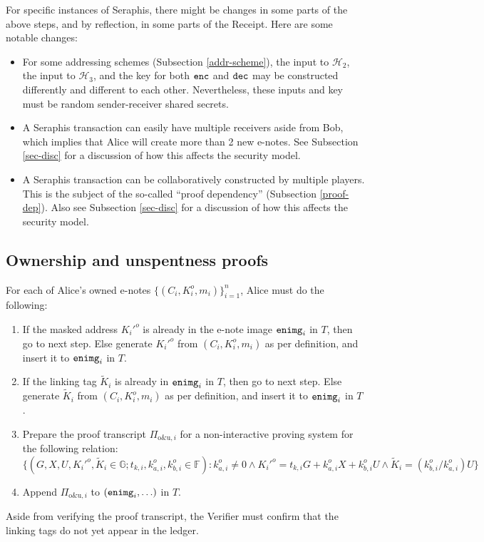\documentclass{article}
\begin{document}
For specific instances of Seraphis, there might be changes in some parts of the above steps, and by reflection, in some parts of the Receipt. Here are some notable changes:
\begin{itemize}
\item For some addressing schemes (Subsection \ref{addr-scheme}), the input to $\mathcal{H}_2$, the input to $\mathcal{H}_3$, and the key for both ${\tt enc}$ and ${\tt dec}$ may be constructed differently and different to each other. Nevertheless, these inputs and key must be random sender-receiver shared secrets.
\item A Seraphis transaction can easily have multiple receivers aside from Bob, which implies that Alice will create more than 2 new e-notes. See Subsection \ref{sec-disc} for a discussion of how this affects the security model.
\item A Seraphis transaction can be collaboratively constructed by multiple players. This is the subject of the so-called ``proof dependency'' (Subsection \ref{proof-dep}). Also see Subsection \ref{sec-disc} for a discussion of how this affects the security model.
\end{itemize}

\subsection{Ownership and unspentness proofs}\label{own-unsp}
For each of Alice's owned e-notes $\{(C_i,K_i^o,m_i)\}_{i=1}^n$, Alice must do the following:
\begin{enumerate}
    \item If the masked address $K_i'^o$ is already in the e-note image ${\tt enimg}_i$ in $T$, then go to next step. Else generate $K_i'^o$ from $(C_i, K_i^o, m_i)$ as per definition, and insert it to ${\tt enimg}_i$ in $T$.
    \item If the linking tag $\tilde{K}_i$ is already in ${\tt enimg}_i$ in $T$, then go to next step. Else generate $\tilde{K}_i$ from $(C_i, K_i^o, m_i)$ as per definition, and insert it to ${\tt enimg}_i$ in $T$.
    \item Prepare the proof transcript $\Pi_{\text{o\&u}, i}$ for a non-interactive proving system for the following relation:
$$\{(G, X, U, K_i'^o, \tilde{K}_i\in\mathbb{G}; t_{k,i}, k_{a,i}^o, k_{b,i}^o\in\mathbb{F}): k_{a,i}^o \ne 0 \wedge K_i'^o = t_{k,i} G + k_{a,i}^o X + k_{b,i}^o U \wedge \tilde{K}_i = (k_{b,i}^o/k_{a,i}^o)U \}$$
    \item Append $\Pi_{\text{o\&u}, i}$ to $({\tt enimg}_i, \ldots)$ in $T$.
\end{enumerate}
Aside from verifying the proof transcript, the Verifier must confirm that the linking tags do not yet appear in the ledger.
\end{document}
